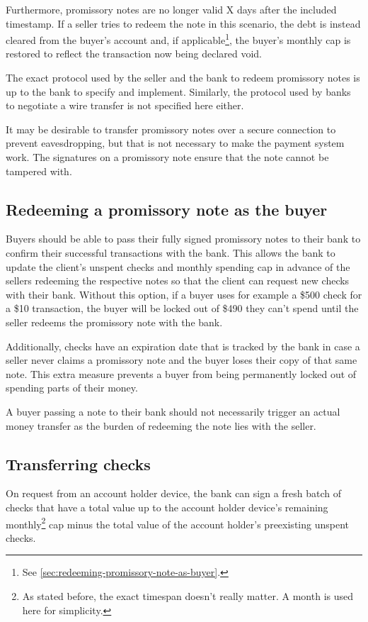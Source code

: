 \documentclass[12pt,a4paper]{article}
\begin{document}
\begin{multicols}{2}
	Furthermore, promissory notes are no longer valid X days after the included timestamp. If a seller tries to redeem the note in this scenario, the debt is instead cleared from the buyer's account and, if applicable\footnote{See \autoref{sec:redeeming-promissory-note-as-buyer}.}, the buyer's monthly cap is restored to reflect the transaction now being declared void.

	The exact protocol used by the seller and the bank to redeem promissory notes is up to the bank to specify and implement. Similarly, the protocol used by banks to negotiate a wire transfer is not specified here either.

	It may be desirable to transfer promissory notes over a secure connection to prevent eavesdropping, but that is not necessary to make the payment system work. The signatures on a promissory note ensure that the note cannot be tampered with.
	
	\subsection{Redeeming a promissory note as the buyer}
	\label{sec:redeeming-promissory-note-as-buyer}

	Buyers should be able to pass their fully signed promissory notes to their bank to confirm their successful transactions with the bank. This allows the bank to update the client's unspent checks and monthly spending cap in advance of the sellers redeeming the respective notes so that the client can request new checks with their bank. Without this option, if a buyer uses for example a \$500 check for a \$10 transaction, the buyer will be locked out of \$490 they can't spend until the seller redeems the promissory note with the bank.
	
	Additionally, checks have an expiration date that is tracked by the bank in case a seller never claims a promissory note and the buyer loses their copy of that same note. This extra measure prevents a buyer from being permanently locked out of spending parts of their money.
	
	A buyer passing a note to their bank should not necessarily trigger an actual money transfer as the burden of redeeming the note lies with the seller.

	\subsection{Transferring checks}

	On request from an account holder device, the bank can sign a fresh batch of checks that have a total value up to the account holder device's remaining monthly\footnote{As stated before, the exact timespan doesn't really matter. A month is used here for simplicity.} cap minus the total value of the account holder's preexisting unspent checks.


\end{multicols}
\end{document}

